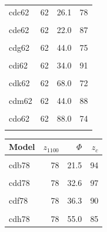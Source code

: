 \documentclass[draft,linenumbers]{agujournal2018} %
\begin{document}
\begin{landscape}
\begin{table}
\begin{tabular}[t]{lrrr}
cdc62 & 62 & 26.1 & 78\\
\cellcolor{gray!6}{cdd62} & \cellcolor{gray!6}{62} & \cellcolor{gray!6}{32.6} & \cellcolor{gray!6}{77}\\
cde62 & 62 & 22.0 & 87\\
\addlinespace
\cellcolor{gray!6}{cdf62} & \cellcolor{gray!6}{62} & \cellcolor{gray!6}{36.3} & \cellcolor{gray!6}{82}\\
cdg62 & 62 & 44.0 & 75\\
\cellcolor{gray!6}{cdh62} & \cellcolor{gray!6}{62} & \cellcolor{gray!6}{55.0} & \cellcolor{gray!6}{70}\\
cdi62 & 62 & 34.0 & 91\\
\cellcolor{gray!6}{cdj62} & \cellcolor{gray!6}{62} & \cellcolor{gray!6}{56.1} & \cellcolor{gray!6}{77}\\
\addlinespace
cdk62 & 62 & 68.0 & 72\\
\cellcolor{gray!6}{cdl62} & \cellcolor{gray!6}{62} & \cellcolor{gray!6}{85.0} & \cellcolor{gray!6}{67}\\
cdm62 & 62 & 44.0 & 88\\
\cellcolor{gray!6}{cdn62} & \cellcolor{gray!6}{62} & \cellcolor{gray!6}{72.6} & \cellcolor{gray!6}{77}\\
cdo62 & 62 & 88.0 & 74\\
\addlinespace
\cellcolor{gray!6}{cdp62} & \cellcolor{gray!6}{62} & \cellcolor{gray!6}{110.0} & \cellcolor{gray!6}{75}\\
\bottomrule
\end{tabular}
\centering
\begin{tabular}[t]{lrrr}
\toprule
Model & $z_{1100}$ & $\Phi$ & \vphantom{1} $z_c$\\
\midrule
\cellcolor{gray!6}{cda78} & \cellcolor{gray!6}{78} & \cellcolor{gray!6}{13.0} & \cellcolor{gray!6}{87}\\
cdb78 & 78 & 21.5 & 94\\
\cellcolor{gray!6}{cdc78} & \cellcolor{gray!6}{78} & \cellcolor{gray!6}{26.1} & \cellcolor{gray!6}{97}\\
cdd78 & 78 & 32.6 & 97\\
\cellcolor{gray!6}{cde78} & \cellcolor{gray!6}{78} & \cellcolor{gray!6}{22.0} & \cellcolor{gray!6}{90}\\
\addlinespace
cdf78 & 78 & 36.3 & 90\\
\cellcolor{gray!6}{cdg78} & \cellcolor{gray!6}{78} & \cellcolor{gray!6}{44.0} & \cellcolor{gray!6}{88}\\
cdh78 & 78 & 55.0 & 85\\

\end{tabular}
\end{table}
\end{landscape}
\end{document}
